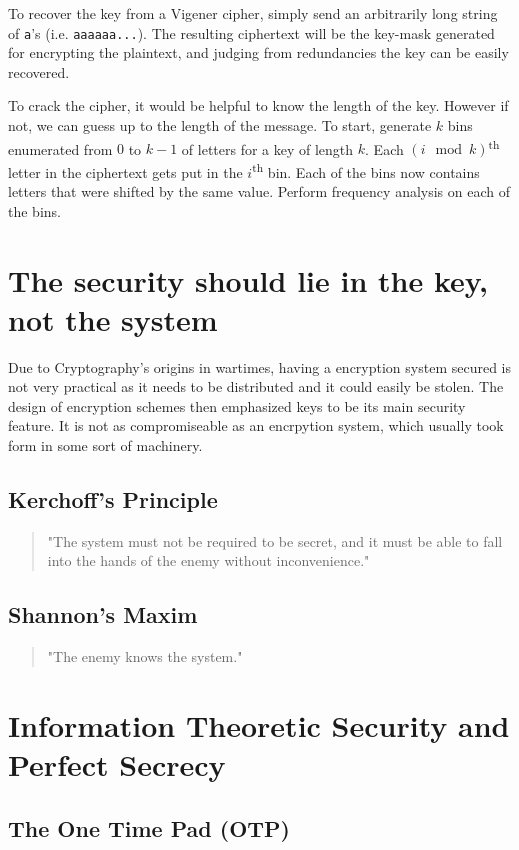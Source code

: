 \documentclass{article}
\begin{document}
\begin{multicols}{2}
To recover the key from a Vigener cipher, simply send an arbitrarily long string of \texttt{a}'s (i.e. \texttt{aaaaaa...}). The resulting ciphertext will be the key-mask generated for encrypting the plaintext, and judging from redundancies the key can be easily recovered.

To crack the cipher, it would be helpful to know the length of the key. However if not, we can guess up to the length of the message. To start, generate $k$ bins enumerated from $0$ to $k-1$ of letters for a key of length $k$. Each $(i \mod k)$\textsuperscript{th} letter in the ciphertext gets put in the $i$\textsuperscript{th} bin. Each of the bins now contains letters that were shifted by the same value. Perform frequency analysis on each of the bins.

\section{The security should lie in the key, not the system}

Due to Cryptography's origins in wartimes, having a encryption system secured is not very practical as it needs to be distributed and it could easily be stolen. The design of encryption schemes then emphasized keys to be its main security feature. It is not as compromiseable as an encrpytion system, which usually took form in some sort of machinery.

\subsection{Kerchoff's Principle}
\begin{quote}
    "The system must not be required to be secret, and it must be able to fall into the hands of the enemy without inconvenience."
\end{quote}
\subsection{Shannon's Maxim}
\begin{quote}
    "The enemy knows the system."
\end{quote}

\section {Information Theoretic Security and Perfect Secrecy}

\subsection{The One Time Pad (OTP)}


\end{multicols}
\end{document}
